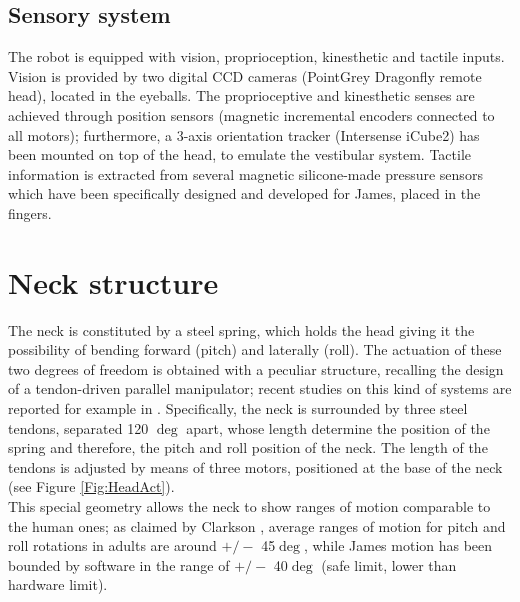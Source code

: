 \documentclass[conference]{IEEEtran}
\numberwithin{equation}{section}
\begin{document}
\subsection{Sensory system}

The robot is equipped with vision, proprioception, kinesthetic and tactile inputs. Vision is provided by two digital CCD cameras (PointGrey Dragonfly remote head), located in the eyeballs. The proprioceptive and kinesthetic senses are achieved through position sensors (magnetic incremental encoders connected to all motors); furthermore, a 3-axis orientation tracker (Intersense iCube2) has been mounted on top of the head, to emulate the vestibular system. Tactile information is extracted from several magnetic silicone-made pressure sensors which have been specifically designed and developed for James, placed in the fingers.

\section{Neck structure} \label{Sec:NeckStructure}

The neck is constituted by a steel spring, which holds the head giving it the possibility of bending forward (pitch) and laterally (roll). The actuation of these two degrees of freedom is obtained with a peculiar structure, recalling the design of a tendon-driven parallel manipulator; recent studies on this kind of systems are reported for example in \cite{Verhoeven00parallel,Hay05parallel}. Specifically, the neck is surrounded by three steel tendons, separated 120 $\deg$ apart, whose length determine the position of the spring and therefore, the pitch and roll position of the neck. The length of the tendons is adjusted by means of three motors, positioned at the base of the neck (see Figure \ref{Fig:HeadAct}).\\This special geometry allows the neck to show ranges of motion comparable to the human ones; as claimed by Clarkson \cite{Clarkson00skeleton}, average ranges of motion for pitch and roll rotations in adults are around $+/-$ 45$\deg$, while James motion has been bounded by software in the range of $+/-$ 40$\deg$ (safe limit, lower than hardware limit).
\end{document}
